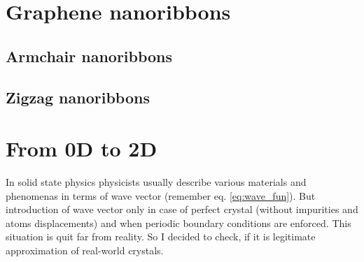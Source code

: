 \chapter{Graphene nanoribbons}
\section{Armchair nanoribbons}

\section{Zigzag nanoribbons}

\chapter{From 0D to 2D}
In solid state physics physicists usually describe various materials and phenomenas in terms of wave vector (remember eq. \ref{eq:wave_fun}). But introduction of wave vector only in case of perfect crystal (without impurities and atoms displacements) and when periodic boundary conditions are enforced. This situation is quit far from reality. So I decided to check, if it is legitimate approximation of real-world crystals.

